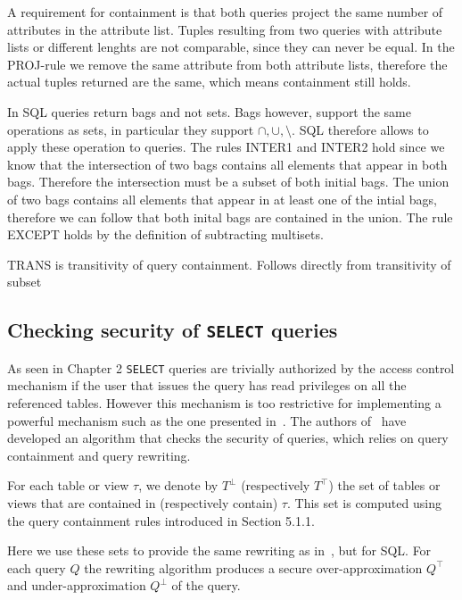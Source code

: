 A requirement for containment is that both queries project the same number of attributes in the attribute list. 
%
Tuples resulting from two queries with attribute lists or different lenghts are not comparable, since they can never be equal.
%
In the PROJ-rule we remove the same attribute from both attribute lists, therefore the actual tuples returned are the same, which means containment still holds.

In SQL queries return bags and not sets.
%
Bags however, support the same operations as sets, in particular they support $\cap, \cup, \setminus$.
%
SQL therefore allows to apply these operation to queries.
%
The rules INTER1 and INTER2 hold since we know that the intersection of two bags contains all elements that appear in both bags.
%
Therefore the intersection must be a subset of both initial bags.
%
The union of two bags contains all elements that appear in at least one of the intial bags, therefore we can follow that both inital bags are contained in the union.
%
The rule EXCEPT holds by the definition of subtracting multisets.

TRANS is transitivity of query containment. Follows directly from transitivity of subset

\FloatBarrier
\subsection{Checking security of \texttt{SELECT} queries}

As seen in Chapter 2 \texttt{SELECT} queries are trivially authorized by the access control mechanism if the user that issues the query has read privileges on all the referenced tables.
%
However this mechanism is too restrictive for implementing a powerful mechanism such as the one presented in~\cite{guarnieri2016strong}.
%
The authors of~\cite{guarnieri2016strong} have developed an algorithm that checks the security of queries, which relies on query containment and query rewriting. 

For each table or view $\tau$, we denote by $T^\bot$ (respectively $T^\top$) the set of tables or views that are contained in (respectively contain) $\tau$.
%
This set is computed using the query containment rules introduced in Section 5.1.1.
%

Here we use these sets to provide the same rewriting as in~\cite{guarnieri2016strong}, but for SQL.
%
For each query $Q$ the rewriting algorithm produces a secure over-approximation $Q^\top$ and under-approximation $Q^\bot$ of the query.

